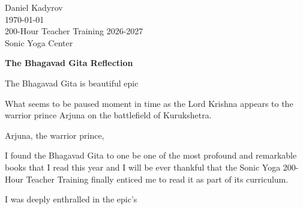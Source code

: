 \documentclass[11pt]{article}
\begin{document}
 
\noindent
Daniel Kadyrov\\
\today\\
200-Hour Teacher Training 2026-2027\\
Sonic Yoga Center
 
\vspace{1em}
 
\begin{center}
  \textbf{The Bhagavad Gita Reflection}
\end{center}
 




The Bhagavad Gita is beautiful epic 

What seems to be paused moment in time as the Lord Krishna appears to the warrior prince Arjuna on the battlefield of Kurukshetra. 

Arjuna, the warrior prince, 


I found the Bhagavad Gita to one be one of the most profound and remarkable books that I read this year and I will be ever thankful that the Sonic Yoga 200-Hour Teacher Training finally enticed me to read it as part of its curriculum.

I was deeply enthralled in the epic's 
 
\end{document}
